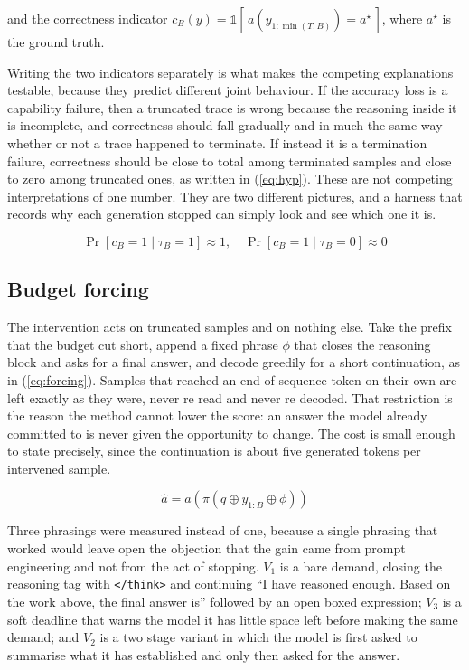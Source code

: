 \documentclass[conference]{IEEEtran}
\begin{document}
and the correctness indicator
$c_B(y) = \mathbb{1}[\,a(y_{1:\min(T,B)}) = a^{\star}\,]$, where $a^{\star}$ is
the ground truth.

Writing the two indicators separately is what makes the competing explanations
testable, because they predict different joint behaviour. If the accuracy loss is
a capability failure, then a truncated trace is wrong because the reasoning inside
it is incomplete, and correctness should fall gradually and in much the same way
whether or not a trace happened to terminate. If instead it is a termination
failure, correctness should be close to total among terminated samples and close
to zero among truncated ones, as written in (\ref{eq:hyp}). These are not
competing interpretations of one number. They are two different pictures, and a
harness that records why each generation stopped can simply look and see which one
it is.

\begin{equation}
\Pr[c_B = 1 \mid \tau_B = 1] \approx 1, \quad
\Pr[c_B = 1 \mid \tau_B = 0] \approx 0
\label{eq:hyp}
\end{equation}

\subsection{Budget forcing}

The intervention acts on truncated samples and on nothing else. Take the prefix
that the budget cut short, append a fixed phrase $\phi$ that closes the reasoning
block and asks for a final answer, and decode greedily for a short continuation,
as in (\ref{eq:forcing}). Samples that reached an end of sequence token on their
own are left exactly as they were, never re read and never re decoded. That
restriction is the reason the method cannot lower the score: an answer the model
already committed to is never given the opportunity to change. The cost is small
enough to state precisely, since the continuation is about five generated tokens
per intervened sample.

\begin{equation}
\hat{a} = a\!\left(\pi\!\left(q \oplus y_{1:B} \oplus \phi\right)\right)
\label{eq:forcing}
\end{equation}

Three phrasings were measured instead of one, because a single phrasing that
worked would leave open the objection that the gain came from prompt engineering
and not from the act of stopping. $V_1$ is a bare demand, closing the
reasoning tag with \texttt{\textless/think\textgreater} and continuing ``I have
reasoned enough. Based on the work above, the final answer is'' followed by an
open boxed expression; $V_3$ is a soft deadline that warns the model it has little
space left before making the same demand; and $V_2$ is a two stage variant in
which the model is first asked to summarise what it has established and only then
asked for the answer.
\end{document}
